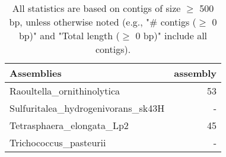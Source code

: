 \documentclass[12pt,a4paper]{article}
\begin{document}
\begin{table}[ht]
\begin{center}
\caption{All statistics are based on contigs of size $\geq$ 500 bp, unless otherwise noted (e.g., "\# contigs ($\geq$ 0 bp)" and "Total length ($\geq$ 0 bp)" include all contigs).}
\begin{tabular}{|l*{1}{|r}|}
\hline
Assemblies & assembly \\ \hline
Raoultella\_ornithinolytica & 53 \\ \hline
Sulfuritalea\_hydrogenivorans\_sk43H & - \\ \hline
Tetrasphaera\_elongata\_Lp2 & 45 \\ \hline
Trichococcus\_pasteurii & - \\ \hline
\end{tabular}
\end{center}
\end{table}
\end{document}
